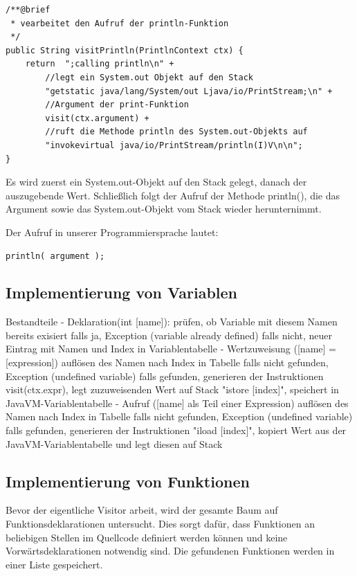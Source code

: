\begin{lstlisting}[frame=single]
/**@brief
 * vearbeitet den Aufruf der println-Funktion
 */
public String visitPrintln(PrintlnContext ctx) {
	return  ";calling println\n" + 
		//legt ein System.out Objekt auf den Stack
		"getstatic java/lang/System/out Ljava/io/PrintStream;\n" + 	
		//Argument der print-Funktion
		visit(ctx.argument) + 						
		//ruft die Methode println des System.out-Objekts auf
		"invokevirtual java/io/PrintStream/println(I)V\n\n"; 				
}
\end{lstlisting}

Es wird zuerst ein System.out-Objekt auf den Stack gelegt, danach der auszugebende Wert. Schließlich folgt der Aufruf der Methode println(), die das Argument sowie das System.out-Objekt vom Stack wieder herunternimmt.


Der Aufruf in unserer Programmiersprache lautet: 
\begin{lstlisting}[frame=single]
println( argument );
\end{lstlisting}

\subsection{Implementierung von Variablen}
Bestandteile
	-	Deklaration(int [name]):
			prüfen, ob Variable mit diesem Namen bereits exisiert
				falls ja, Exception (variable already defined)
				falls nicht, neuer Eintrag mit Namen und Index in Variablentabelle
	-	Wertzuweisung ([name] = [expression])
			auflösen des Namen nach Index in Tabelle
				falls nicht gefunden, Exception (undefined variable)
				falls gefunden, generieren der Instruktionen
					visit(ctx.expr), legt zuzuweisenden Wert auf Stack
					"istore [index]", speichert in JavaVM-Variablentabelle
	-	Aufruf ([name] als Teil einer Expression)
			auflösen des Namen nach Index in Tabelle
				falls nicht gefunden, Exception (undefined variable)
				falls gefunden, generieren der Instruktionen
					"iload [index]", kopiert Wert aus der JavaVM-Variablentabelle und legt diesen auf Stack


\subsection{Implementierung von Funktionen}
Bevor der eigentliche Visitor arbeit, wird der gesamte Baum auf Funktionsdeklarationen untersucht. Dies sorgt dafür, dass Funktionen an beliebigen Stellen im Quellcode definiert werden können und keine Vorwärtsdeklarationen notwendig sind. Die gefundenen Funktionen werden in einer Liste gespeichert.

